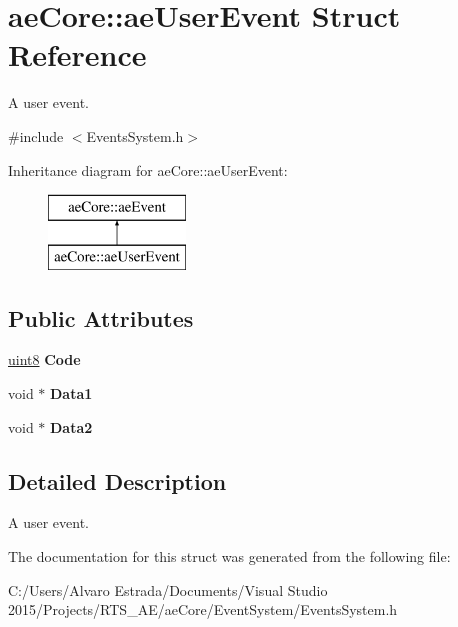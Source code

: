 \hypertarget{structae_core_1_1ae_user_event}{}\section{ae\+Core\+:\+:ae\+User\+Event Struct Reference}
\label{structae_core_1_1ae_user_event}


A user event.  




{\ttfamily \#include $<$Events\+System.\+h$>$}

Inheritance diagram for ae\+Core\+:\+:ae\+User\+Event\+:\begin{figure}[H]
\begin{center}
\leavevmode
\includegraphics[height=2.000000cm]{structae_core_1_1ae_user_event}
\end{center}
\end{figure}
\subsection*{Public Attributes}
\begin{DoxyCompactItemize}
\item 
\hyperlink{namespaceae_core_aa13093dc911869e5b24942552898f01f}{uint8} {\bfseries Code}\hypertarget{structae_core_1_1ae_user_event_a4f80ce8bd55f94a07e60f7140892cf5e}{}\label{structae_core_1_1ae_user_event_a4f80ce8bd55f94a07e60f7140892cf5e}

\item 
void $\ast$ {\bfseries Data1}\hypertarget{structae_core_1_1ae_user_event_a5e4c9f121f7e9c91c291f5de7d77f5ca}{}\label{structae_core_1_1ae_user_event_a5e4c9f121f7e9c91c291f5de7d77f5ca}

\item 
void $\ast$ {\bfseries Data2}\hypertarget{structae_core_1_1ae_user_event_a60a7b8d60f77ecac995251f9fc914b54}{}\label{structae_core_1_1ae_user_event_a60a7b8d60f77ecac995251f9fc914b54}

\end{DoxyCompactItemize}


\subsection{Detailed Description}
A user event. 

The documentation for this struct was generated from the following file\+:\begin{DoxyCompactItemize}
\item 
C\+:/\+Users/\+Alvaro Estrada/\+Documents/\+Visual Studio 2015/\+Projects/\+R\+T\+S\+\_\+\+A\+E/ae\+Core/\+Event\+System/Events\+System.\+h\end{DoxyCompactItemize}
